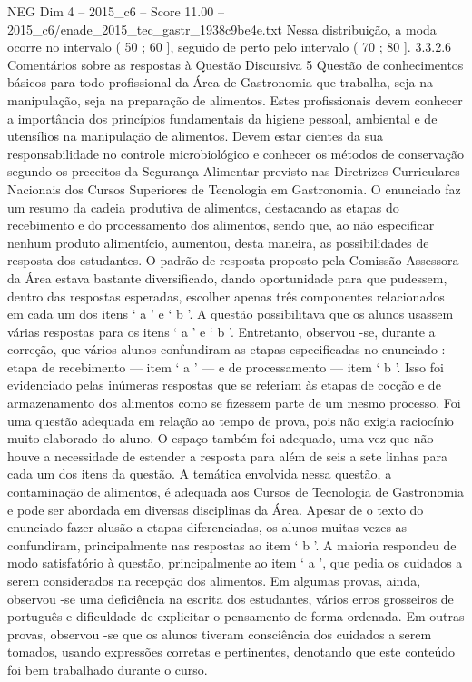 \begin{textsample}{NEG Dim 4 – 2015\_c6 – Score 11.00 – 2015\_c6/enade\_2015\_tec\_gastr\_1938c9be4e.txt}
Nessa distribuição, a moda ocorre no intervalo ( 50 ; 60 ], seguido de perto pelo intervalo ( 70 ; 80 ]. 3.3.2.6 Comentários sobre as respostas à Questão Discursiva 5 Questão de conhecimentos básicos para todo profissional da Área de Gastronomia que trabalha, seja na manipulação, seja na preparação de alimentos.
Estes profissionais devem conhecer a importância dos princípios fundamentais da higiene pessoal, ambiental e de utensílios na manipulação de alimentos.
Devem estar cientes da sua responsabilidade no controle microbiológico e conhecer os métodos de conservação segundo os preceitos da Segurança Alimentar previsto nas Diretrizes Curriculares Nacionais dos Cursos Superiores de Tecnologia em Gastronomia.
O enunciado faz um resumo da cadeia produtiva de alimentos, destacando as etapas do recebimento e do processamento dos alimentos, sendo que, ao não especificar nenhum produto alimentício, aumentou, desta maneira, as possibilidades de resposta dos estudantes.
O padrão de resposta proposto pela Comissão Assessora da Área estava bastante diversificado, dando oportunidade para que pudessem, dentro das respostas esperadas, escolher apenas três componentes relacionados em cada um dos itens ‘ a ’ e ‘ b ’.
A questão possibilitava que os alunos usassem várias respostas para os itens ‘ a ’ e ‘ b ’.
Entretanto, observou -se, durante a correção, que vários alunos confundiram as etapas especificadas no enunciado : etapa de recebimento — item ‘ a ’ — e de processamento — item ‘ b ’.
Isso foi evidenciado pelas inúmeras respostas que se referiam às etapas de cocção e de armazenamento dos alimentos como se fizessem parte de um mesmo processo.
Foi uma questão adequada em relação ao tempo de prova, pois não exigia raciocínio muito elaborado do aluno.
O espaço também foi adequado, uma vez que não houve a necessidade de estender a resposta para além de seis a sete linhas para cada um dos itens da questão.
A temática envolvida nessa questão, a contaminação de alimentos, é adequada aos Cursos de Tecnologia de Gastronomia e pode ser abordada em diversas disciplinas da Área.
Apesar de o texto do enunciado fazer alusão a etapas diferenciadas, os alunos muitas vezes as confundiram, principalmente nas respostas ao item ‘ b ’.
A maioria respondeu de modo satisfatório à questão, principalmente ao item ‘ a ’, que pedia os cuidados a serem considerados na recepção dos alimentos.
Em algumas provas, ainda, observou -se uma deficiência na escrita dos estudantes, vários erros grosseiros de português e dificuldade de explicitar o pensamento de forma ordenada.
Em outras provas, observou -se que os alunos tiveram consciência dos cuidados a serem tomados, usando expressões corretas e pertinentes, denotando que este conteúdo foi bem trabalhado durante o curso.

\end{textsample}
